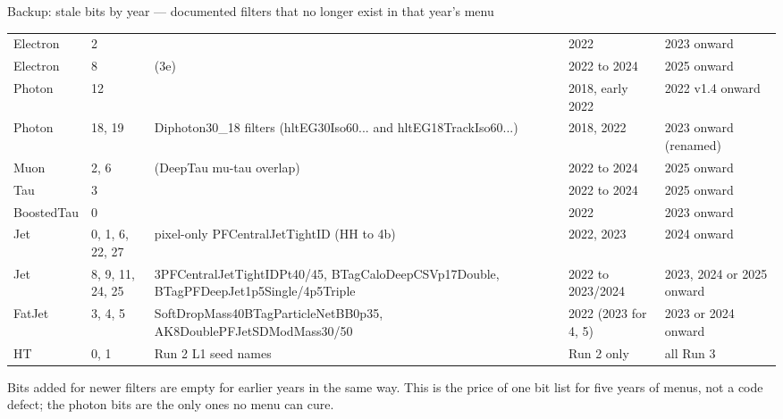 \begin{frame}{Backup: stale bits by year --- documented filters that no longer exist in that year's menu}
  \vspace{0pt}\par
  {\tiny
  \begin{tabularx}{\linewidth}{@{}llYll@{}}
    \toprule
     &  &  &  & \\\midrule
    Electron & 2 &  & 2022 & 2023 onward\\
    Electron & 8 &  (3e) & 2022 to 2024 & 2025 onward\\
    Photon & 12 &  & 2018, early 2022 & 2022 v1.4 onward\\
    Photon & 18, 19 & Diphoton30\_18 filters (hltEG30Iso60... and hltEG18TrackIso60...) & 2018, 2022 & 2023 onward (renamed)\\
    Muon & 2, 6 &  (DeepTau mu-tau overlap) & 2022 to 2024 & 2025 onward\\
    Tau & 3 &  & 2022 to 2024 & 2025 onward\\
    BoostedTau & 0 &  & 2022 & 2023 onward\\
    Jet & 0, 1, 6, 22, 27 & pixel-only PFCentralJetTightID (HH to 4b) & 2022, 2023 & 2024 onward\\
    Jet & 8, 9, 11, 24, 25 & 3PFCentralJetTightIDPt40/45, BTagCaloDeepCSVp17Double, BTagPFDeepJet1p5Single/4p5Triple & 2022 to 2023/2024 & 2023, 2024 or 2025 onward\\
    FatJet & 3, 4, 5 & SoftDropMass40BTagParticleNetBB0p35, AK8DoublePFJetSDModMass30/50 & 2022 (2023 for 4, 5) & 2023 or 2024 onward\\
    HT & 0, 1 & Run 2 L1 seed names & Run 2 only & all Run 3\\\bottomrule
  \end{tabularx}}
  \par\vspace{5pt}
  {\scriptsize Bits added for newer filters are empty for earlier years in the same way. This is the price of one bit
  list for five years of menus, not a code defect; the photon bits are the only ones no menu can cure.}
\end{frame}

